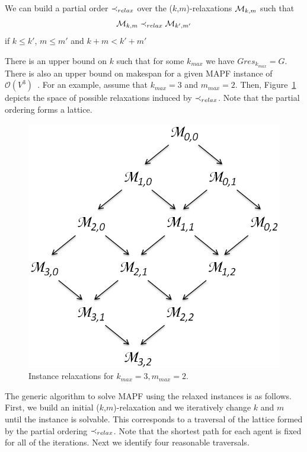 We can build a partial order $\mathrel{\prec_{relax}}$ over the ($k$,$m$)-relaxations ${\mathcal{M}}_{k,m}$ such that 
\[
{\mathcal{M}}_{k,m} \mathrel{\prec_{relax}} {\mathcal{M}}_{k',m'}
\]
\noindent if $k \leq k'$, $m\leq m'$ and $k+m < k'+m'$

There is an upper bound on $k$ such that for some $k_{max}$ we have $Gres_{k_{max}} = G$. There is also an upper bound on makespan for a given MAPF instance of $\mathcal{O}(V^3)$~\cite{pebble_motion}. %
For an example, assume that $k_{max}=3$ and $m_{max}=2$. Then, Figure~\ref{fig:example-relax} depicts the space of possible relaxations induced by $\mathrel{\prec_{relax}}$. Note that the partial ordering forms a lattice.

\begin{figure}[h]
  \centering
  \includegraphics[width=0.65\columnwidth]{img/km_relax}
  \caption{Instance relaxations for \(k_{max}=3, m_{max}=2\).}
  \label{fig:example-relax}
\end{figure}

The generic algorithm to solve MAPF using the relaxed instances is as follows. First, we build an initial ($k$,$m$)-relaxation and we iteratively change $k$ and $m$ until the instance is solvable. This corresponds to a traversal of the lattice formed by the partial ordering $\mathrel{\prec_{relax}}$. Note that the shortest path for each agent is fixed for all of the iterations. Next we identify four reasonable traversals.



